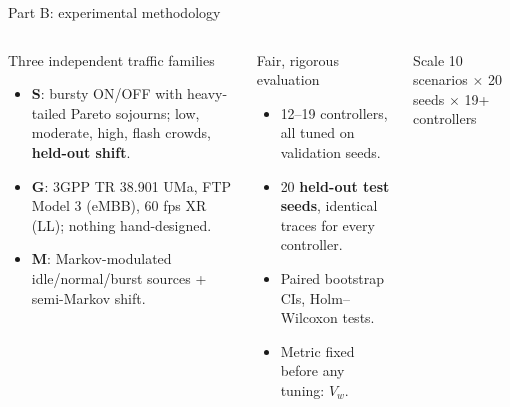 \documentclass[aspectratio=169,11pt]{beamer}
\begin{document}
\begin{frame}{Part B: experimental methodology}
\begin{columns}[T]
\small
\begin{block}{Three independent traffic families}
\begin{itemize}
  \item \textbf{S}: bursty ON/OFF with heavy-tailed Pareto sojourns; low, moderate, high, flash crowds, \textbf{held-out shift}.
  \item \textbf{G}: 3GPP TR 38.901 UMa, FTP Model 3 (eMBB), 60 fps XR (LL); nothing hand-designed.
  \item \textbf{M}: Markov-modulated idle/normal/burst sources + semi-Markov shift.
\end{itemize}
\end{block}
\small
\begin{block}{Fair, rigorous evaluation}
\begin{itemize}
  \item 12--19 controllers, all tuned on validation seeds.
  \item 20 \textbf{held-out test seeds}, identical traces for every controller.
  \item Paired bootstrap CIs, Holm--Wilcoxon tests.
  \item Metric fixed before any tuning: $V_w$.
\end{itemize}
\end{block}
\begin{exampleblock}{Scale}
10 scenarios $\times$ 20 seeds $\times$ 19+ controllers
\end{exampleblock}
\end{columns}
\end{frame}
\end{document}

